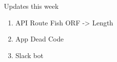 

\begin{frame}{Updates this week}
    \begin{enumerate}
        \item API Route Fish ORF -> Length
        \item App Dead Code
        \item Slack bot
    \end{enumerate}
\end{frame}

